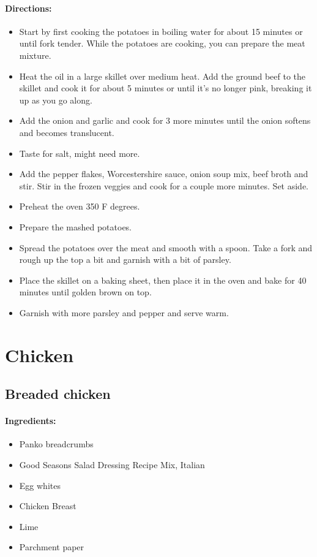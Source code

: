 \documentclass{article}
\begin{document}
\paragraph{Directions:}
\begin{itemize}
  \item Start by first cooking the potatoes in boiling water for about 15 minutes or until fork tender. While the potatoes are cooking, you can prepare the meat mixture.
  \item Heat the oil in a large skillet over medium heat. Add the ground beef to the skillet and cook it for about 5 minutes or until it’s no longer pink, breaking it up as you go along.
  \item Add the onion and garlic and cook for 3 more minutes until the onion softens and becomes translucent.
  \item Taste for salt, might need more.
  \item Add the pepper flakes, Worcestershire sauce, onion soup mix, beef broth and stir. Stir in the frozen veggies and cook for a couple more minutes. Set aside.
  \item Preheat the oven 350 F degrees.
  \item Prepare the mashed potatoes.
  \item Spread the potatoes over the meat and smooth with a spoon. Take a fork and rough up the top a bit and garnish with a bit of parsley.
  \item Place the skillet on a baking sheet, then place it in the oven and bake for 40 minutes until golden brown on top.
  \item Garnish with more parsley and pepper and serve warm.
\end{itemize}


\section{Chicken}

\subsection{Breaded chicken}

\paragraph{Ingredients:}

\begin{itemize}
	\item Panko breadcrumbs
	\item Good Seasons Salad Dressing Recipe Mix, Italian
	\item Egg whites
	\item Chicken Breast
	\item Lime
	\item Parchment paper
\end{itemize}
\end{document}
